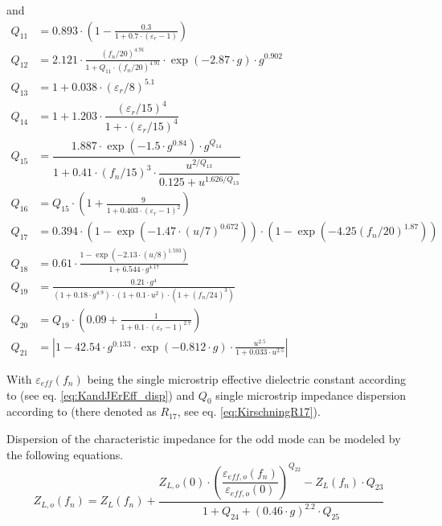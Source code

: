 \documentclass[10pt]{report}
\begin{document}
and
\begin{align}
Q_{11} &= 0.893\cdot \left( 1 - \frac{0.3}{1+0.7\cdot\left(\varepsilon_r-1\right)} \right)\\
Q_{12} &= 2.121\cdot \frac{\left( f_n/20\right) ^{4.91}}
                         {1+Q_{11}\cdot\left( f_n/20\right) ^{4.91}}
	      \cdot \exp\left(-2.87\cdot g\right)\cdot g^{0.902}\\
Q_{13} &= 1 + 0.038\cdot \left( \varepsilon_r/8 \right) ^{5.1}\\
Q_{14} &= 1 + 1.203\cdot \dfrac{ \left( \varepsilon_r/15 \right) ^4}
                             {1 + \cdot \left( \varepsilon_r/15 \right) ^4}\\
Q_{15} &= \dfrac{ 1.887\cdot \exp\left(-1.5\cdot g^{0.84}\right)\cdot g^{Q_{14}} }
              { 1 + 0.41\cdot \left( f_n/15 \right) ^3 \cdot
	        \dfrac{u^{2/Q_{13}}}{0.125 + u^{1.626/Q_{13}}}}\\
Q_{16} &= Q_{15}\cdot \left( 1 + \frac{9}{1+0.403\cdot \left(\varepsilon_r-1\right)^2} \right)\\
Q_{17} &= 0.394\cdot \left( 1-\exp\left( -1.47\cdot\left( u/7 \right) ^{0.672} \right) \right)
        \cdot \left( 1-\exp\left( -4.25\left( f_n/20 \right) ^{1.87} \right) \right)\\
Q_{18} &= 0.61\cdot\frac{1-\exp\left( -2.13\cdot\left( u/8 \right) ^{1.593} \right)}
                  {1+6.544\cdot g^{4.17}}\\
Q_{19} &= \frac{ 0.21\cdot g^4 }{\left(1+0.18\cdot g^{4.9}\right)\cdot \left(1+0.1\cdot u^2\right) \cdot
                \left( 1+\left( f_n/24 \right) ^3 \right)}\\
Q_{20} &= Q_{19}\cdot \left( 0.09 + \frac{1}{1+0.1\cdot \left(\varepsilon_r-1\right)^{2.7}} \right)\\
Q_{21} &= \left| 1-42.54\cdot g^{0.133}\cdot \exp\left(-0.812\cdot g\right)
                   \cdot\frac{u^{2.5}}{1+0.033\cdot u^{2.5}} \right|
\end{align}

With $\varepsilon_{eff}(f_n)$ being the single microstrip effective
dielectric constant according to \cite{Kirschning3} (see eq.
\eqref{eq:KandJErEff_disp}) and $Q_0$ single microstrip impedance
dispersion according to \cite{Kirschning1} (there denoted as $R_{17}$,
see eq. \eqref{eq:KirschningR17}).

\addvspace{12pt}

Dispersion of the characteristic impedance for the odd mode can be
modeled by the following equations.
\begin{equation}
Z_{L,o}(f_n) = Z_L(f_n) + \dfrac{ Z_{L,o}(0)\cdot
               \left( \dfrac{\varepsilon_{eff,o}(f_n)}{\varepsilon_{eff,o}(0)} \right) ^{Q_{22}}
	     - Z_L(f_n)\cdot Q_{23} }{ 1+Q_{24}+\left(0.46\cdot g\right)^{2.2} \cdot Q_{25} }
\end{equation}
\end{document}
